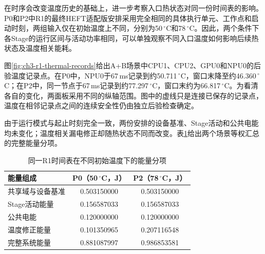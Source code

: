 在时序会改变温度历史的基础上，进一步考察入口热状态对同一份时间表的影响。P0和P2中R1的最终HEFT适配版安排采用完全相同的具体执行单元、工作点和启动时刻，两组输入仅在初始温度上不同，分别为50\,$^\circ$C和78\,$^\circ$C。因此，两个条件下各Stage的运行区间与活动功率相同，可以单独观察不同入口温度如何影响后续热状态及温度相关能耗。

图\ref{fig:ch3-r1-thermal-records}给出A+B场景中CPU1、CPU2、GPU0和NPU0的后验温度记录点。在P0中，NPU0于67\,ms记录到约50.711\,$^\circ$C，窗口末降至约46.360\,$^\circ$C；在P2中，同一节点于67\,ms记录到约77.297\,$^\circ$C，窗口末约为66.817\,$^\circ$C。为看清各自的变化，两面板采用不同的纵轴范围。图中的虚线只是连接已保存的记录点，温度在相邻记录点之间的连续安全性仍由独立后验检查确定。



由于运行模式与起止时刻完全一致，两份安排的设备基准、Stage活动和公共电能均未变化；温度相关漏电修正却随热状态不同而改变。表\ref{tab:exp-thermal-energy}给出两个场景等权汇总的完整能量分项。
\begin{table}[htbp]
\centering
\caption{同一R1时间表在不同初始温度下的能量分项}
\label{tab:exp-thermal-energy}
\begin{tabular}{lcc}
\toprule
能量组成 & P0（50\,$^\circ$C，J） & P2（78\,$^\circ$C，J） \\
\midrule
共享域与设备基准 & 0.503150000 & 0.503150000 \\
Stage活动能量 & 0.156587033 & 0.156587033 \\
公共电能 & 0.120000000 & 0.120000000 \\
温度修正能量 & 0.101350965 & 0.207116548 \\
\midrule
完整系统能量 & 0.881087997 & 0.986853581 \\
\bottomrule
\end{tabular}
\end{table}

